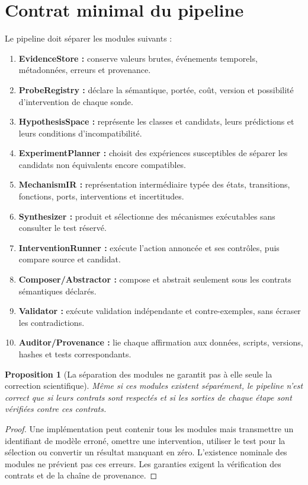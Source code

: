 \documentclass[11pt,oneside]{book}
\newtheorem{proposition}[theoreme]{Proposition}
\theoremstyle{definition}
\theoremstyle{remark}
\newcommand{\1}{\mathbf 1}
\begin{document}
\section{Contrat minimal du pipeline}
Le pipeline doit séparer les modules suivants :
\begin{enumerate}
\item \textbf{EvidenceStore :} conserve valeurs brutes, événements temporels, métadonnées, erreurs et provenance.
\item \textbf{ProbeRegistry :} déclare la sémantique, portée, coût, version et possibilité d'intervention de chaque sonde.
\item \textbf{HypothesisSpace :} représente les classes et candidats, leurs prédictions et leurs conditions d'incompatibilité.
\item \textbf{ExperimentPlanner :} choisit des expériences susceptibles de séparer les candidats non équivalents encore compatibles.
\item \textbf{MechanismIR :} représentation intermédiaire typée des états, transitions, fonctions, ports, interventions et incertitudes.
\item \textbf{Synthesizer :} produit et sélectionne des mécanismes exécutables sans consulter le test réservé.
\item \textbf{InterventionRunner :} exécute l'action annoncée et ses contrôles, puis compare source et candidat.
\item \textbf{Composer/Abstractor :} compose et abstrait seulement sous les contrats sémantiques déclarés.
\item \textbf{Validator :} exécute validation indépendante et contre-exemples, sans écraser les contradictions.
\item \textbf{Auditor/Provenance :} lie chaque affirmation aux données, scripts, versions, hashes et tests correspondants.
\end{enumerate}

\begin{proposition}[La séparation des modules ne garantit pas à elle seule la correction scientifique]
Même si ces modules existent séparément, le pipeline n'est correct que si leurs contrats sont respectés et si les sorties de chaque étape sont vérifiées contre ces contrats.
\end{proposition}
\begin{proof}
Une implémentation peut contenir tous les modules mais transmettre un identifiant de modèle erroné, omettre une intervention, utiliser le test pour la sélection ou convertir un résultat manquant en zéro. L'existence nominale des modules ne prévient pas ces erreurs. Les garanties exigent la vérification des contrats et de la chaîne de provenance.\end{proof}
\end{document}
